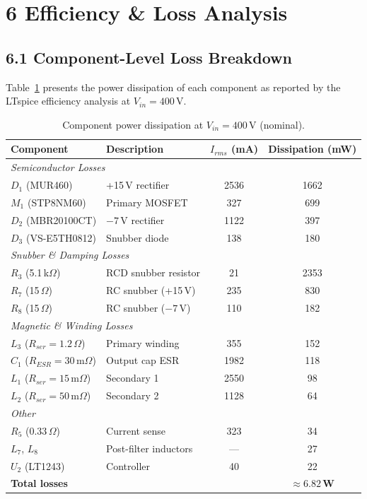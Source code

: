 \section*{6 Efficiency \& Loss Analysis}

\subsection*{6.1 Component-Level Loss Breakdown}

Table~\ref{tab:losses} presents the power dissipation of each component as reported by the LTspice efficiency analysis at $V_{in} = 400$\,V.

\begin{table}[H]
\centering
\caption{Component power dissipation at $V_{in} = 400$\,V (nominal).}
\label{tab:losses}
\begin{tabular}{llcc}
\toprule
\textbf{Component} & \textbf{Description} & \textbf{$I_{rms}$ (mA)} & \textbf{Dissipation (mW)} \\
\midrule
\multicolumn{4}{l}{\textit{Semiconductor Losses}} \\
$D_1$ (MUR460)      & +15\,V rectifier       & 2536 & 1662 \\
$M_1$ (STP8NM60)    & Primary MOSFET         &  327 &  699 \\
$D_2$ (MBR20100CT)  & $-7$\,V rectifier      & 1122 &  397 \\
$D_3$ (VS-E5TH0812) & Snubber diode          &  138 &  180 \\
\midrule
\multicolumn{4}{l}{\textit{Snubber \& Damping Losses}} \\
$R_3$ (5.1\,k$\Omega$) & RCD snubber resistor &   21 & 2353 \\
$R_7$ (15\,$\Omega$)   & RC snubber (+15\,V)  &  235 &  830 \\
$R_8$ (15\,$\Omega$)   & RC snubber ($-7$\,V) &  110 &  182 \\
\midrule
\multicolumn{4}{l}{\textit{Magnetic \& Winding Losses}} \\
$L_3$ ($R_{ser}=1.2\,\Omega$)   & Primary winding  &  355 & 152 \\
$C_1$ ($R_{ESR}=30\,\text{m}\Omega$) & Output cap ESR  & 1982 & 118 \\
$L_1$ ($R_{ser}=15\,\text{m}\Omega$)  & Secondary 1      & 2550 &  98 \\
$L_2$ ($R_{ser}=50\,\text{m}\Omega$)  & Secondary 2      & 1128 &  64 \\
\midrule
\multicolumn{4}{l}{\textit{Other}} \\
$R_5$ (0.33\,$\Omega$)            & Current sense    &  323 &  34 \\
$L_7$, $L_8$                      & Post-filter inductors &  --- &  27 \\
$U_2$ (LT1243)                    & Controller       &   40 &  22 \\
\midrule
\multicolumn{2}{l}{\textbf{Total losses}} & & $\mathbf{\approx 6.82}$\,\textbf{W} \\
\bottomrule
\end{tabular}
\end{table}

